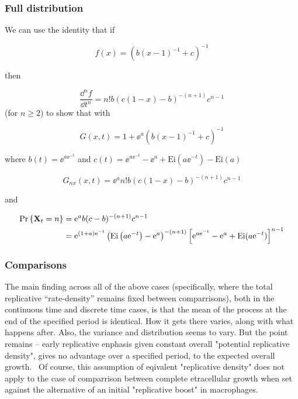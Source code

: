 \subsubsection{Full distribution}


We can use the identity that if 

$$f(x) = (b(x-1)^{-1}  + c)^{-1}$$ 

then



$$\frac{\dd^n f}{\dd t^n}   =  n!b(c(1-x) - b )^{-(n+1)} c^{n-1} $$
 (for $n\geq 2$)
 to show that with 
 
$$G(x,t) = 1 + \ee^a(b(x-1)^{-1} + c)^{-1}$$

where $b(t) = \ee^{a\ee^{-t}}$ and $c(t) = \ee^{a \ee^{-t}} - \ee^a + \text{Ei}(a\ee^{-t})    - \text{Ei}(a)  $


$$G_{nx}(x, t) =  \ee^a n!b(c(1-x) - b )^{-(n+1)} c^{n-1}$$

and

\begin{align}
{\text{Pr}\left\{{{\bf X}_t}= n\right\}} &=  {\rm e}^a b(c - b )^{-(n+1)} c^{n-1} \\
&=    {\rm e}^{(1+a){\rm e}^{-t}}\left(\text{Ei}\left( a{\rm e}^{-t}\right) - {\rm e}^a   \right)^{-(n+1)} \left[{\rm e}^{a {\rm e}^{-t}} - {\rm e}^a + \text{Ei}(a{\rm e}^{-t})  \right]^{n-1}
\end{align}





\subsubsection{Comparisons}







The main finding across all of the above cases (specifically, where the total replicative ``rate-density'' remains fixed between comparrisons), both in the continuous time and discrete time cases, is that the mean of the process at the end of the specified period is identical.  How it gets there varies, along with what happens after. Also, the variance and distribution seems to vary.  But the point remains -- early replicative enphasis given constant overall "potential replicative density", gives no advantage over a specified period, to the expected overall growth. \ 
Of course, this assumption of eqivalent "replicative density" does not apply to the case of comparrison between complete etracellular growth when set against the alternative of an initial "replicative boost" in macrophages. 




